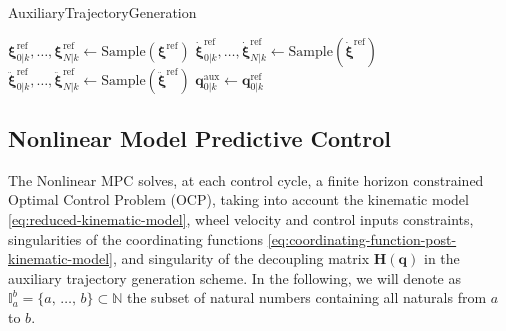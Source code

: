 \begin{algorithm}
\small
\caption{AuxiliaryTrajectoryGeneration}
\label{alg:AuxiliaryTrajectoryGeneration}
\BlankLine
$\bm{\xi}_{0|k}^{\mathrm{ref}}, \dots, \bm{\xi}_{N|k}^{\mathrm{ref}} \gets \mathrm{Sample}(\bm{\xi}^{\mathrm{ref}})$\;
$\dot{\bm{\xi}}_{0|k}^{\mathrm{ref}}, \dots, \dot{\bm{\xi}}_{N|k}^{\mathrm{ref}} \gets \mathrm{Sample}(\dot{\bm{\xi}}^{\mathrm{ref}})$\;
$\ddot{\bm{\xi}}_{0|k}^{\mathrm{ref}}, \dots, \ddot{\bm{\xi}}_{N|k}^{\mathrm{ref}} \gets \mathrm{Sample}(\ddot{\bm{\xi}}^{\mathrm{ref}})$\;
$\bm{q}_{0|k}^{\mathrm{aux}} \gets \bm{q}_{0|k}^{\mathrm{ref}}$\;
\;
\end{algorithm}

\subsection{Nonlinear Model Predictive Control}
\label{sec:model-predictive-control}
The Nonlinear MPC solves, at each control cycle, a finite horizon constrained
Optimal Control Problem (OCP), taking into account the kinematic model
\eqref{eq:reduced-kinematic-model}, wheel velocity and control inputs
constraints, singularities of the coordinating functions
\eqref{eq:coordinating-function-post-kinematic-model}, and singularity of the
decoupling matrix $\bm{H}(\bm{q})$ in the auxiliary trajectory generation scheme.
In the following, we will denote as
$\mathbb{I}_a^b=\{a,\, \dots,\, b\}\subset\mathbb{N}$ the subset of natural
numbers containing all naturals from $a$ to $b$.

